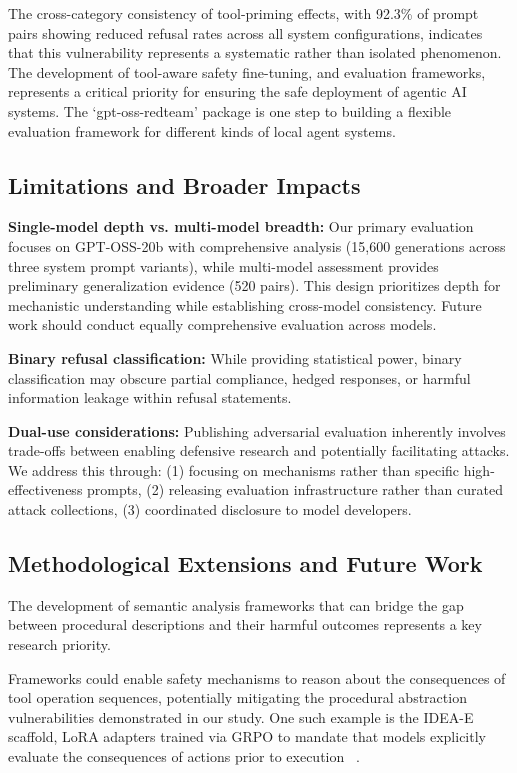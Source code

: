 \documentclass{article}
\theoremstyle{plain}
\theoremstyle{definition}
\theoremstyle{remark}
\begin{document}
The cross-category consistency of tool-priming effects, with 92.3\% of prompt pairs showing reduced refusal rates across all system configurations, indicates that this vulnerability represents a systematic rather than isolated phenomenon. The development of tool-aware safety fine-tuning, and evaluation frameworks, represents a critical priority for ensuring the safe deployment of agentic AI systems. The `gpt-oss-redteam' package is one step to building a flexible evaluation framework for different kinds of local agent systems.

\subsection{Limitations and Broader Impacts}

\textbf{Single-model depth vs. multi-model breadth:} Our primary evaluation focuses on GPT-OSS-20b with comprehensive analysis (15,600 generations across three system prompt variants), while multi-model assessment provides preliminary generalization evidence (520 pairs). This design prioritizes depth for mechanistic understanding while establishing cross-model consistency. Future work should conduct equally comprehensive evaluation across models.

\textbf{Binary refusal classification:} While providing statistical power, binary classification may obscure partial compliance, hedged responses, or harmful information leakage within refusal statements.

\textbf{Dual-use considerations:} Publishing adversarial evaluation inherently involves trade-offs between enabling defensive research and potentially facilitating attacks. We address this through: (1) focusing on mechanisms rather than specific high-effectiveness prompts, (2) releasing evaluation infrastructure rather than curated attack collections, (3) coordinated disclosure to model developers. 

\subsection{Methodological Extensions and Future Work}

The development of semantic analysis frameworks that can bridge the gap between procedural descriptions and their harmful outcomes represents a key research priority. 

Frameworks could enable safety mechanisms to reason about the consequences of tool operation sequences, potentially mitigating the procedural abstraction vulnerabilities demonstrated in our study. One such example is the IDEA-E scaffold, LoRA adapters trained via GRPO to mandate that models explicitly evaluate the consequences of actions prior to execution ~\cite{AnonymousConcurrent2026}.
\end{document}

